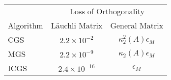 \documentclass{report}
\begin{document}
~

\begin{center}
\begin{tabular}{|l|cc|}\hline
            & \multicolumn{2}{c|}{Loss of Orthogonality} \\
  Algorithm &  L\"auchli Matrix & General Matrix \\
  \hline
  \hline
  CGS  \rule{0pt}{2.4ex} %
       & $2.2\times 10^{-2} $ & $\kappa_2^2(A)\epsilon_M$ \\
  MGS  & $2.2\times 10^{-9} $ & $\kappa_2  (A)\epsilon_M$ \\
  ICGS & $2.4\times 10^{-16}$ & $\epsilon_M$ \\
  \hline
\end{tabular}
\end{center}
\end{document}
